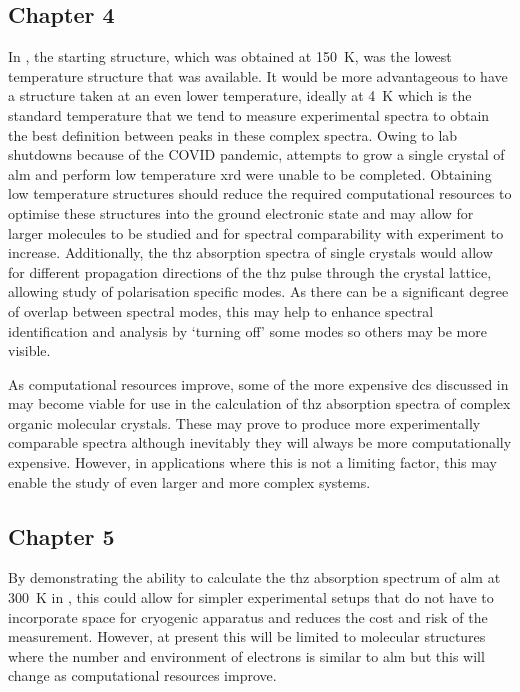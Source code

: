\subsection{Chapter 4}
In , the starting structure, which was obtained at \SI{150}{K}, was the lowest temperature structure that was available. It would be more advantageous to have a structure taken at an even lower temperature, ideally at \SI{4}{K} which is the standard temperature that we tend to measure experimental spectra to obtain the best definition between peaks in these complex spectra. Owing to lab shutdowns because of the COVID pandemic, attempts to grow a single crystal of \acrshort{alm} and perform low temperature \acrshort{xrd} were unable to be completed. Obtaining low temperature structures should reduce the required computational resources to optimise these structures into the ground electronic state and may allow for larger molecules to be studied and for spectral comparability with experiment to increase. Additionally, the \acrshort{thz} absorption spectra of single crystals would allow for different propagation directions of the \acrshort{thz} pulse through the crystal lattice, allowing study of polarisation specific modes. As there can be a significant degree of overlap between spectral modes, this may help to enhance spectral identification and analysis by `turning off' some modes so others may be more visible. 

As computational resources improve, some of the more expensive \acrshort{dc}s discussed in  may become viable for use in the calculation of \acrshort{thz} absorption spectra of complex organic molecular crystals. These may prove to produce more experimentally comparable spectra although inevitably they will always be more computationally expensive. However, in applications where this is not a limiting factor, this may enable the study of even larger and more complex systems.

\subsection{Chapter 5}
By demonstrating the ability to calculate the \acrshort{thz} absorption spectrum of \acrshort{alm} at \SI{300}{K} in , this could allow for simpler experimental setups that do not have to incorporate space for cryogenic apparatus and reduces the cost and risk of the measurement. However, at present this will be limited to molecular structures where the number and environment of electrons is similar to \acrshort{alm} but this will change as computational resources improve.

